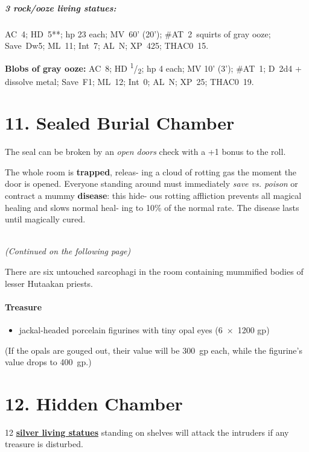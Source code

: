 \documentclass[english,11pt,openany,letterpaper,twocolumn]{book}
\newcommand{\half}{\textsuperscript{1}/\textsubscript{2}}
\begin{document}
\begin{textbox}
	\subparagraph{3 rock/ooze living statues:} AC~4; HD~5**; hp 23 each; MV~60' (20'); \#AT~2~squirts of gray ooze; Save~Dw5; ML~11; Int~7; AL~N; XP~425; THAC0~15.
	
	\tab\textbf{Blobs of gray ooze:} AC~8; HD \half; hp 4 each; MV 10' (3'); \#AT~1; D~2d4 + dissolve metal; Save~F1; ML~12; Int~0; AL~N; XP~25; THAC0~19.
\end{textbox}


\hypertarget{room11}{}
\section{11. Sealed Burial Chamber}

The seal can be broken by an \emph{open doors} check with a +1 bonus to the roll.

\tab The whole room is \textbf{trapped}, releas- ing a cloud of rotting gas the moment the door is opened. Everyone standing around must immediately \emph{save vs. poison} or contract a mummy \textbf{disease}: this hide- ous rotting affliction prevents all magical healing and slows normal heal- ing to 10\% of the normal rate. The disease lasts until magically cured.

{~\\\hfill\em(Continued on the following page)}

\break

\tab There are six untouched sarcophagi in the room containing mummified bodies of lesser Hutaakan priests.

\skipline
\paragraph{Treasure}
\begin{itemize}[leftmargin=*]
	\item jackal-headed porcelain figurines with tiny opal eyes (6~×~1200 gp)
\end{itemize}

(If the opals are gouged out, their value will be 300~gp each, while the figurine's value drops to 400~gp.)


\hypertarget{room12}{}
\section{12. Hidden Chamber}

12 \hyperlink{statue}{\textbf{silver living statues}} standing on shelves will attack the intruders if any treasure is disturbed.
\end{document}
